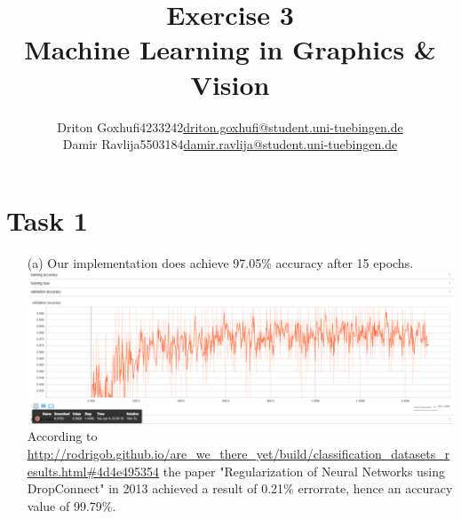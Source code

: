 \documentclass [a4paper, 11pt] {article}
\makeatletter
\newcommand{\courseName}{Machine Learning in Graphics \& Vision}
\newcommand{\homeworkNum}{3}
\newcommand{\studentOne}{Driton Goxhufi}
\newcommand{\studentTwo} {Damir Ravlija}
\newcommand{\matrikelNrStOne}{4233242}
\newcommand{\matrikelNrStTwo}{5503184}
\newcommand{\mailStOne}{driton.goxhufi@student.uni-tuebingen.de}
\newcommand{\mailStTwo}{damir.ravlija@student.uni-tuebingen.de}
\makeatother
\begin{document}
	
\title{\vspace{-1.5cm}\textbf{Exercise \homeworkNum} \\ 
	\courseName}
\author{\begin{tabular}{lcr}
		\studentOne & \matrikelNrStOne & \href{mailto:\mailStOne}{\mailStOne} \\
		\studentTwo & \matrikelNrStTwo & \href{mailto:\mailStTwo}{\mailStTwo} 
\end{tabular}}	
\date{}
\maketitle


\section*{Task 1}
\begin{enumerate}
\item[(a)]
Our implementation does achieve 97.05\% accuracy after 15 epochs.\\
\includegraphics{img/validation_acc_15epochs.png}\\
According to \url{http://rodrigob.github.io/are_we_there_yet/build/classification_datasets_results.html#4d4e495354} the paper "Regularization of Neural Networks using DropConnect" in 2013 achieved a result of 0.21\% errorrate, hence an accuracy value of 99.79\%.


\end{enumerate}
\end{document}

